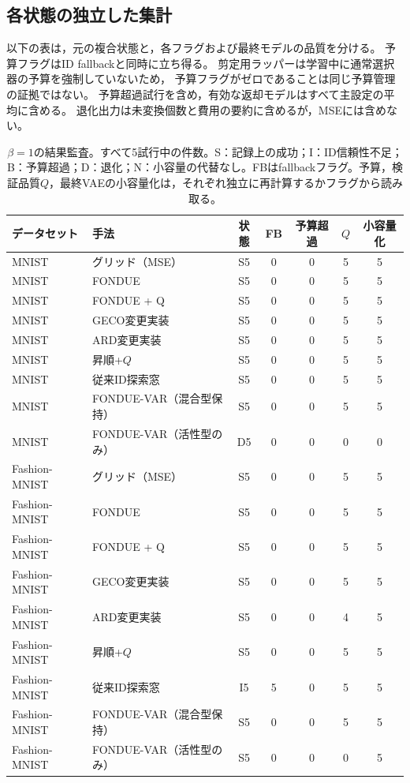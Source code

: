 \documentclass[11pt,a4paper]{ltjsarticle}
\begin{document}
\subsection{各状態の独立した集計}\label{app:outcomes}
以下の表は，元の複合状態と，各フラグおよび最終モデルの品質を分ける。
予算フラグはID fallbackと同時に立ち得る。
剪定用ラッパーは学習中に通常選択器の予算を強制していないため，
予算フラグがゼロであることは同じ予算管理の証拠ではない。
予算超過試行を含め，有効な返却モデルはすべて主設定の平均に含める。
退化出力は未変換個数と費用の要約に含めるが，MSEには含めない。
\begin{table}[H]
\caption{$\beta=1$の結果監査。すべて5試行中の件数。S：記録上の成功；I：ID信頼性不足；B：予算超過；D：退化；N：小容量の代替なし。FBはfallbackフラグ。予算，検証品質$Q$，最終VAEの小容量化は，それぞれ独立に再計算するかフラグから読み取る。}\label{tab:outcomes0}
\footnotesize
\setlength{\tabcolsep}{3.5pt}
\begin{tabular*}{\textwidth}{@{\extracolsep{\fill}}llccccc@{}}
\toprule
データセット & 手法 & 状態 & FB & 予算超過 & $Q$ & 小容量化 \\
\midrule
MNIST & グリッド（MSE） & S5 & 0 & 0 & 5 & 5 \\
MNIST & FONDUE & S5 & 0 & 0 & 5 & 5 \\
MNIST & FONDUE + Q & S5 & 0 & 0 & 5 & 5 \\
MNIST & GECO変更実装 & S5 & 0 & 0 & 5 & 5 \\
MNIST & ARD変更実装 & S5 & 0 & 0 & 5 & 5 \\
MNIST & 昇順+$Q$ & S5 & 0 & 0 & 5 & 5 \\
MNIST & 従来ID探索窓 & S5 & 0 & 0 & 5 & 5 \\
MNIST & FONDUE-VAR（混合型保持） & S5 & 0 & 0 & 5 & 5 \\
MNIST & FONDUE-VAR（活性型のみ） & D5 & 0 & 0 & 0 & 0 \\
Fashion-MNIST & グリッド（MSE） & S5 & 0 & 0 & 5 & 5 \\
Fashion-MNIST & FONDUE & S5 & 0 & 0 & 5 & 5 \\
Fashion-MNIST & FONDUE + Q & S5 & 0 & 0 & 5 & 5 \\
Fashion-MNIST & GECO変更実装 & S5 & 0 & 0 & 5 & 5 \\
Fashion-MNIST & ARD変更実装 & S5 & 0 & 0 & 4 & 5 \\
Fashion-MNIST & 昇順+$Q$ & S5 & 0 & 0 & 5 & 5 \\
Fashion-MNIST & 従来ID探索窓 & I5 & 5 & 0 & 5 & 5 \\
Fashion-MNIST & FONDUE-VAR（混合型保持） & S5 & 0 & 0 & 5 & 5 \\
Fashion-MNIST & FONDUE-VAR（活性型のみ） & S5 & 0 & 0 & 0 & 5 \\
\bottomrule
\end{tabular*}
\end{table}
\end{document}
